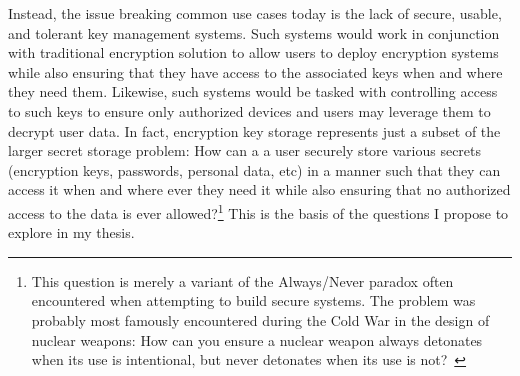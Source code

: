 Instead, the issue breaking common use cases today is the lack of
secure, usable, and tolerant key management systems. Such systems
would work in conjunction with traditional encryption solution to
allow users to deploy encryption systems while also ensuring that they
have access to the associated keys when and where they need
them. Likewise, such systems would be tasked with controlling access
to such keys to ensure only authorized devices and users may leverage
them to decrypt user data. In fact, encryption key storage represents
just a subset of the larger secret storage problem: How can a a user
securely store various secrets (encryption keys, passwords, personal
data, etc) in a manner such that they can access it when and where
ever they need it while also ensuring that no authorized access to the
data is ever allowed?\footnote{This question is merely a variant of
  the Always/Never paradox often encountered when attempting to build
  secure systems. The problem was probably most famously encountered
  during the Cold War in the design of nuclear weapons: How can you
  ensure a nuclear weapon always detonates when its use is
  intentional, but never detonates when its use is
  not?~\cite{schlosser2013}} This is the basis of the questions I
propose to explore in my thesis.

